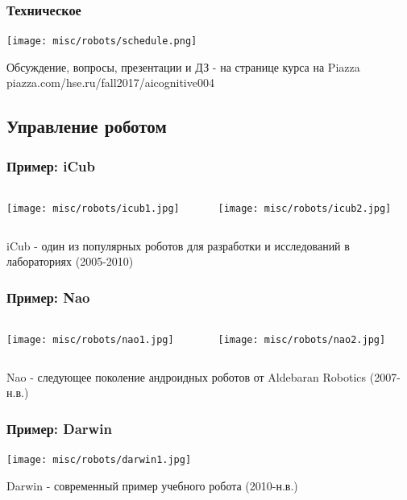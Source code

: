 \documentclass[default]{beamer}
\begin{document}
	\begin{frame}
		\frametitle{Техническое}
		
		\centering
		\texttt{[image: misc/robots/schedule.png]}
		
		\par\bigskip
		
		Обсуждение, вопросы, презентации и ДЗ - на странице курса на Piazza piazza.com/hse.ru/fall2017/aicognitive004
		
	\end{frame}
	

	
	\subsection{Управление роботом}
	\begin{frame}
		\frametitle{Пример: iCub}
		
		
		\begin{columns}
			\begin{column}{0.5\textwidth}
				\centering
				\texttt{[image: misc/robots/icub1.jpg]}
			\end{column}
			\begin{column}{0.5\textwidth}
				\centering
				\texttt{[image: misc/robots/icub2.jpg]}
			\end{column}
		\end{columns}
		\par\bigskip
		iCub - один из популярных роботов для разработки и исследований в лабораториях (2005-2010)
	\end{frame}

	\begin{frame}
		\frametitle{Пример: Nao}
		
		
		\begin{columns}
			\begin{column}{0.5\textwidth}
				\centering
				\texttt{[image: misc/robots/nao1.jpg]}
			\end{column}
			\begin{column}{0.5\textwidth}
				\centering
				\texttt{[image: misc/robots/nao2.jpg]}
			\end{column}
		\end{columns}
		\par\bigskip
		Nao - следующее поколение андроидных роботов от Aldebaran Robotics (2007-н.в.)
	\end{frame}


	\begin{frame}
		\frametitle{Пример: Darwin}
		
		\centering
		\texttt{[image: misc/robots/darwin1.jpg]}
		\par\bigskip
		Darwin - современный пример учебного робота (2010-н.в.)
	\end{frame}
\end{document}

